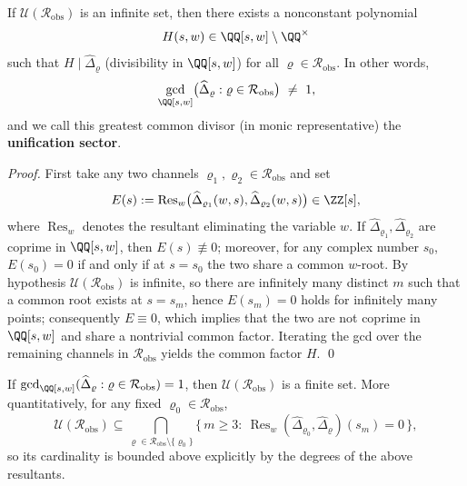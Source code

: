 \begin{theorem}[Cyclotomic specialization rigidity: infinitely many common slow-mode layers \texorpdfstring{$\Rightarrow$}{=>} existence of a unification sector]\label{thm:cyclotomic-specialization-rigidity}
If \(\mathcal{U}(\mathcal{R}_{\mathrm{obs}})\) is an infinite set, then there exists a nonconstant polynomial
\[
H(s,w)\in \QQ[s,w]\setminus\QQ^\times
\]
such that \(H\mid \widehat{\Delta}_{\varrho}\) (divisibility in \(\QQ[s,w]\)) for all \(\varrho\in\mathcal{R}_{\mathrm{obs}}\).
In other words,
\[
\gcd_{\QQ[s,w]}\bigl(\widehat{\Delta}_{\varrho}:\varrho\in\mathcal{R}_{\mathrm{obs}}\bigr)\ \neq\ 1,
\]
and we call this greatest common divisor (in monic representative) the \textbf{unification sector}.
\end{theorem}
\begin{proof}
First take any two channels \(\varrho_1,\varrho_2\in\mathcal{R}_{\mathrm{obs}}\) and set
\[
E(s):=\operatorname{Res}_{w}\bigl(\widehat{\Delta}_{\varrho_1}(w,s),\widehat{\Delta}_{\varrho_2}(w,s)\bigr)\in\ZZ[s],
\]
where \(\operatorname{Res}_{w}\) denotes the resultant eliminating the variable \(w\).
If \(\widehat{\Delta}_{\varrho_1},\widehat{\Delta}_{\varrho_2}\) are coprime in \(\QQ[s,w]\), then \(E(s)\not\equiv 0\);
moreover, for any complex number \(s_0\), \(E(s_0)=0\) if and only if at \(s=s_0\) the two share a common \(w\)-root.
By hypothesis \(\mathcal{U}(\mathcal{R}_{\mathrm{obs}})\) is infinite, so there are infinitely many distinct \(m\) such that a common root exists at \(s=s_m\), hence \(E(s_m)=0\) holds for infinitely many points; consequently \(E\equiv 0\), which implies that the two are not coprime in \(\QQ[s,w]\) and share a nontrivial common factor.
Iterating the gcd over the remaining channels in \(\mathcal{R}_{\mathrm{obs}}\) yields the common factor \(H\). \qed
\end{proof}

\begin{corollary}[Finite falsifiability: no unification sector \texorpdfstring{$\Rightarrow$}{=>} the set of common slow-mode layers must be finite]\label{cor:cyclotomic-specialization-falsifiability}
If
\(
\gcd_{\QQ[s,w]}(\widehat{\Delta}_{\varrho}:\varrho\in\mathcal{R}_{\mathrm{obs}})=1
\),
then \(\mathcal{U}(\mathcal{R}_{\mathrm{obs}})\) is a finite set.
More quantitatively, for any fixed \(\varrho_0\in\mathcal{R}_{\mathrm{obs}}\),
\[
\mathcal{U}(\mathcal{R}_{\mathrm{obs}})
\subseteq
\bigcap_{\varrho\in\mathcal{R}_{\mathrm{obs}}\setminus\{\varrho_0\}}
\bigl\{\,m\ge 3:\ \operatorname{Res}_{w}(\widehat{\Delta}_{\varrho_0},\widehat{\Delta}_{\varrho})(s_m)=0\,\bigr\},
\]
so its cardinality is bounded above explicitly by the degrees of the above resultants.
\end{corollary}

